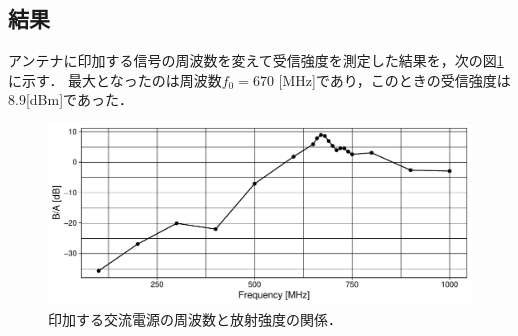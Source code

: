 \documentclass[uplatex,dvipdfmx,a4j,12pt]{jsarticle}
\begin{document}
\subsection{結果}
アンテナに印加する信号の周波数を変えて受信強度を測定した結果を，次の図\ref{fig:5-1}に示す．
最大となったのは周波数$f_0 = 670$ [MHz]であり，このときの受信強度は8.9[dBm]であった．
\begin{figure}[H]
    \centering
    \includegraphics[width=\linewidth]{data/5_1/gain.pdf}
    \caption{印加する交流電源の周波数と放射強度の関係．}
    \label{fig:5-1}
\end{figure}
\end{document}
